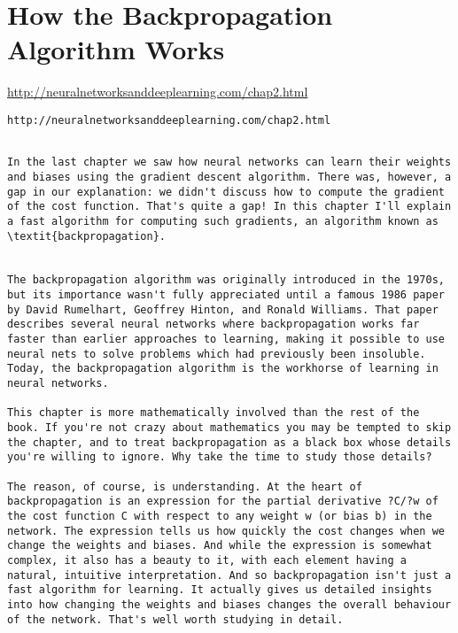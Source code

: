 
\chapter{How the Backpropagation Algorithm Works}

\url{http://neuralnetworksanddeeplearning.com/chap2.html}

\lstinline{http://neuralnetworksanddeeplearning.com/chap2.html}


\begin{lstlisting}

In the last chapter we saw how neural networks can learn their weights and biases using the gradient descent algorithm. There was, however, a gap in our explanation: we didn't discuss how to compute the gradient of the cost function. That's quite a gap! In this chapter I'll explain a fast algorithm for computing such gradients, an algorithm known as \textit{backpropagation}. 


The backpropagation algorithm was originally introduced in the 1970s, but its importance wasn't fully appreciated until a famous 1986 paper by David Rumelhart, Geoffrey Hinton, and Ronald Williams. That paper describes several neural networks where backpropagation works far faster than earlier approaches to learning, making it possible to use neural nets to solve problems which had previously been insoluble. Today, the backpropagation algorithm is the workhorse of learning in neural networks.

This chapter is more mathematically involved than the rest of the book. If you're not crazy about mathematics you may be tempted to skip the chapter, and to treat backpropagation as a black box whose details you're willing to ignore. Why take the time to study those details?

The reason, of course, is understanding. At the heart of backpropagation is an expression for the partial derivative ?C/?w of the cost function C with respect to any weight w (or bias b) in the network. The expression tells us how quickly the cost changes when we change the weights and biases. And while the expression is somewhat complex, it also has a beauty to it, with each element having a natural, intuitive interpretation. And so backpropagation isn't just a fast algorithm for learning. It actually gives us detailed insights into how changing the weights and biases changes the overall behaviour of the network. That's well worth studying in detail.


\end{lstlisting}
